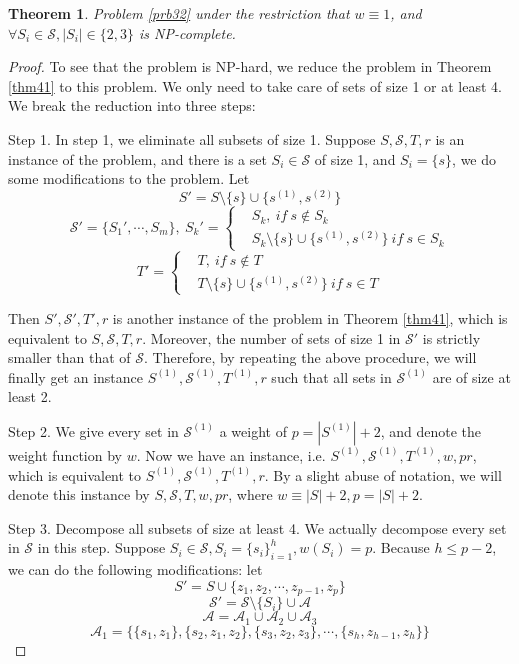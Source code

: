 \documentclass[10pt,fleqn]{article}
\newtheorem{theorem}{Theorem}[section]
\newcommand{\rs}{\setminus}
\newcommand{\mc}[1]{\mathcal{#1}}
\begin{document}
	\begin{theorem}
		Problem \ref{prb32} under the restriction that $w\equiv1$, and $\forall S_i\in\mc{S},|S_i|\in\{2,3\}$ is NP-complete. 
	\end{theorem}
	\begin{proof}
		To see that the problem is NP-hard, we reduce the problem in Theorem \ref{thm41} to this problem. We only need to take care of sets of size 1 or at least 4. We break the reduction into three steps: \par
		Step 1. In step 1, we eliminate all subsets of size 1. Suppose $S,\mc{S},T,r$ is an instance of the problem, and there is a set $S_i\in\mc{S}$ of size 1, and $S_i=\{s\}$, we do some modifications to the problem. Let
		$$S'=S\rs\{s\}\cup\{s^{(1)},s^{(2)}\}$$ 
		$$\mc{S}'=\{S_1',\cdots,S_m\},\ 
		S_k'=\left\{
		\begin{aligned}
			&S_k,\ if\ s\notin S_k \\
			&S_k\rs\{s\}\cup\{s^{(1)},s^{(2)}\}\ if\ s\in S_k
		\end{aligned}
		\right.
		$$
		$$T'=\left\{
		\begin{aligned}
			&T,\ if\ s\notin T \\
			&T\rs\{s\}\cup\{s^{(1)},s^{(2)}\}\ if\ s\in T
		\end{aligned}
		\right.
		$$ \par
		Then $S',\mc{S}',T',r$ is another instance of the problem in Theorem \ref{thm41}, which is equivalent to $S,\mc{S},T,r$. Moreover, the number of sets of size 1 in $\mc{S}'$ is strictly smaller than that of $\mc{S}$. Therefore, by repeating the above procedure, we will finally get an instance $S^{(1)},\mc{S}^{(1)},T^{(1)},r$ such that all sets in $\mc{S}^{(1)}$ are of size at least 2. \par
		Step 2. We give every set in $\mc{S}^{(1)}$ a weight of $p=|S^{(1)}|+2$, and denote the weight function by $w$. Now we have an instance, i.e. $S^{(1)},\mc{S}^{(1)},T^{(1)},w,pr$, which is equivalent to $S^{(1)},\mc{S}^{(1)},T^{(1)},r$. By a slight abuse of notation, we will denote this instance by $S,\mc{S},T,w,pr$, where $w\equiv|S|+2,p=|S|+2$.\par 
		Step 3. Decompose all subsets of size at least 4. We actually decompose every set in $\mc{S}$ in this step. Suppose $S_i\in\mc{S},S_i=\{s_i\}_{i=1}^h,w(S_i)=p$. Because $h\leq p-2$, we can do the following modifications: let
		$$S'=S\cup\{z_1,z_2,\cdots,z_{p-1},z_p\}$$
		$$\mc{S}'=\mc{S}\rs\{S_i\}\cup\mc{A}$$
		$$\mc{A}=\mc{A}_1\cup\mc{A}_2\cup\mc{A}_3$$
		$$\mc{A}_1=\{\{s_1,z_1\},\{s_2,z_1,z_2\},\{s_3,z_2,z_3\},\cdots,\{s_h,z_{h-1},z_h\}\}$$

\end{proof}
\end{document}
